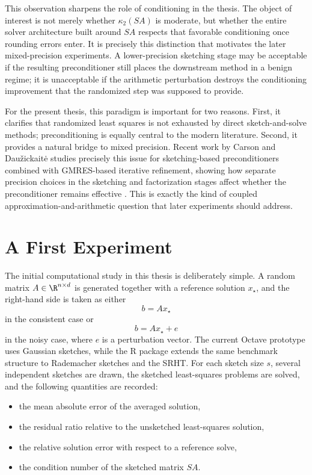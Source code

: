 This observation sharpens the role of conditioning in the thesis. The object of interest is not merely whether \(\kappa_2(SA)\) is moderate, but whether the entire solver architecture built around \(SA\) respects that favorable conditioning once rounding errors enter. It is precisely this distinction that motivates the later mixed-precision experiments. A lower-precision sketching stage may be acceptable if the resulting preconditioner still places the downstream method in a benign regime; it is unacceptable if the arithmetic perturbation destroys the conditioning improvement that the randomized step was supposed to provide.

For the present thesis, this paradigm is important for two reasons. First, it clarifies that randomized least squares is not exhausted by direct sketch-and-solve methods; preconditioning is equally central to the modern literature. Second, it provides a natural bridge to mixed precision. Recent work by Carson and Dau\v{z}ickait\.{e} studies precisely this issue for sketching-based preconditioners combined with GMRES-based iterative refinement, showing how separate precision choices in the sketching and factorization stages affect whether the preconditioner remains effective \cite{carson2024mixedsketching}. This is exactly the kind of coupled approximation-and-arithmetic question that later experiments should address.

\section{A First Experiment}

The initial computational study in this thesis is deliberately simple. A random matrix \(A \in \R^{n \times d}\) is generated together with a reference solution \(x_\star\), and the right-hand side is taken as either
\[
	b = Ax_\star
\]
in the consistent case or
\[
	b = Ax_\star + e
\]
in the noisy case, where \(e\) is a perturbation vector. The current Octave prototype uses Gaussian sketches, while the R package extends the same benchmark structure to Rademacher sketches and the SRHT. For each sketch size \(s\), several independent sketches are drawn, the sketched least-squares problems are solved, and the following quantities are recorded:
\begin{itemize}
	\item the mean absolute error of the averaged solution,
	\item the residual ratio relative to the unsketched least-squares solution,
	\item the relative solution error with respect to a reference solve,
	\item the condition number of the sketched matrix \(SA\).
\end{itemize}

